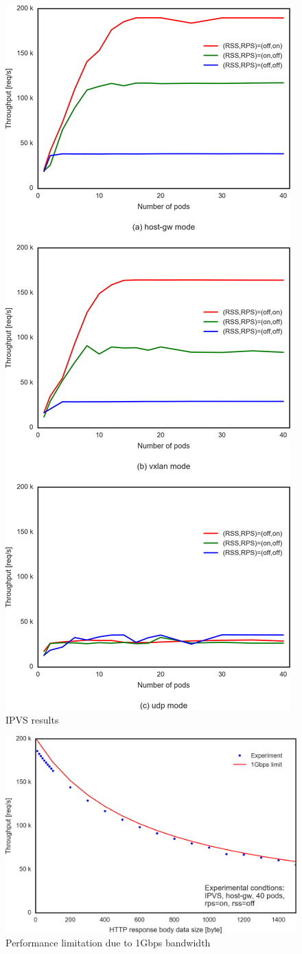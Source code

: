 \begin{figure}
  \centering
  \includegraphics[width=0.6\columnwidth]{Figs/ipvs_3figs}
  \caption{IPVS results}
  \label{fig:IPVS3figs}
\end{figure}

\begin{figure}
  \centering
  \includegraphics[width=0.8\columnwidth]{Figs/performance_limitation}
  \caption{Performance limitation due to 1Gbps bandwidth}
  \label{fig:performance_limitation}
\end{figure}

